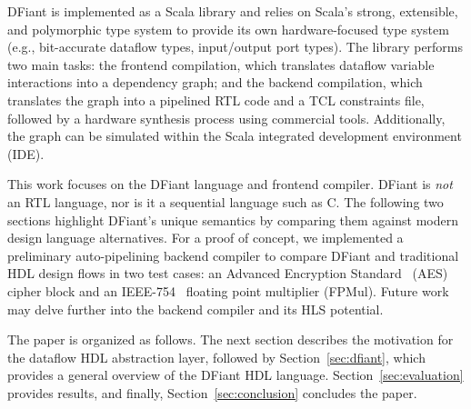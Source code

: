 DFiant is implemented as a Scala library and relies on Scala's strong, extensible, and polymorphic type system to provide its own hardware-focused type system (e.g., bit-accurate dataflow types, input/output port types). The library performs two main tasks: the frontend compilation, which translates dataflow variable interactions into a dependency graph; and the backend compilation, which translates the graph into a pipelined RTL code and a TCL constraints file, followed by a hardware synthesis process using commercial tools. Additionally, the graph can be simulated within the Scala integrated development environment (IDE). 

This work focuses on the DFiant language and frontend compiler. DFiant is \emph{not} an RTL language, nor is it a sequential language such as C. The following two sections highlight DFiant's unique semantics by comparing them against modern design language alternatives. For a proof of concept, we implemented a preliminary auto-pipelining backend compiler to compare DFiant and traditional HDL design flows in two test cases: an Advanced Encryption Standard~\cite{pub2001197} (AES) cipher block and an IEEE-754~\cite{IEEE2008} floating point multiplier (FPMul). Future work may delve further into the backend compiler and its HLS potential.


The paper is organized as follows. The next section describes the motivation for the dataflow HDL abstraction layer, followed by Section~\ref{sec:dfiant}, which provides a general overview of the DFiant HDL language. 
Section~\ref{sec:evaluation} provides results, and finally, Section~\ref{sec:conclusion} concludes the paper.




 





